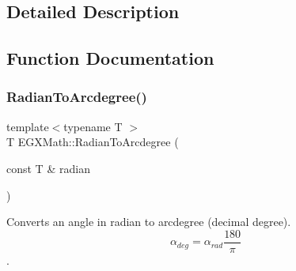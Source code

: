 \subsection{Detailed Description}


\subsection{Function Documentation}
\mbox{\label{group___e_g_x_math-_angle_conversions-_radian_ga3dfdc97357cc07f8379976bbc08f9852}} 
\subsubsection{\texorpdfstring{Radian\+To\+Arcdegree()}{RadianToArcdegree()}}
{\footnotesize\ttfamily template$<$typename T $>$ \\
T E\+G\+X\+Math\+::\+Radian\+To\+Arcdegree (\begin{DoxyParamCaption}\item[{const T \&}]{radian }\end{DoxyParamCaption})}



Converts an angle in radian to arcdegree (decimal degree). \[\alpha_{deg}=\alpha_{rad}\frac{180}{\pi}\]. 

